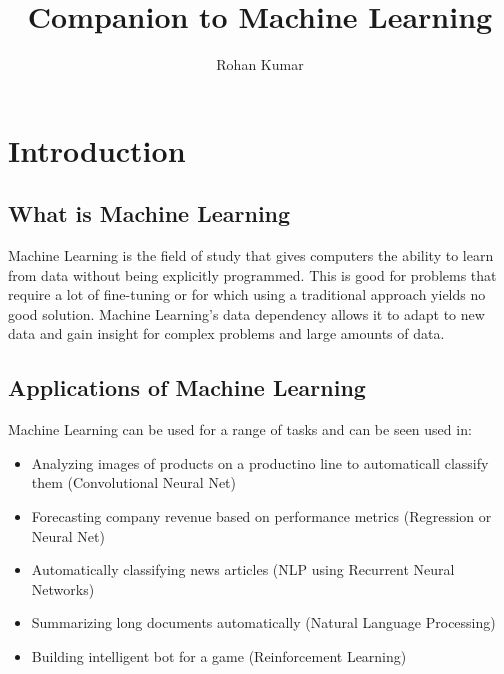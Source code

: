 \documentclass[12pt]{article}
\title{Companion to Machine Learning}
\author{Rohan Kumar}
\date{}
\begin{document}
\maketitle
\newpage
\tableofcontents
\newpage

\section*{Introduction}

\subsection{What is Machine Learning}
    Machine Learning is the field of study that gives computers the ability to learn from data without being 
    explicitly programmed. This is good for problems that require a lot of fine-tuning or for which using a 
    traditional approach yields no good solution. Machine Learning's data dependency allows it to adapt to new data
    and gain insight for complex problems and large amounts of data.

\subsection{Applications of Machine Learning}
    Machine Learning can be used for a range of tasks and can be seen used in:
    \begin{itemize}
        \item Analyzing images of products on a productino line to automaticall classify them (Convolutional Neural Net)
        \item Forecasting company revenue based on performance metrics (Regression or Neural Net)
        \item Automatically classifying news articles (NLP using Recurrent Neural Networks)
        \item Summarizing long documents automatically (Natural Language Processing)
        \item Building intelligent bot for a game (Reinforcement Learning)
    \end{itemize}
\end{document}
